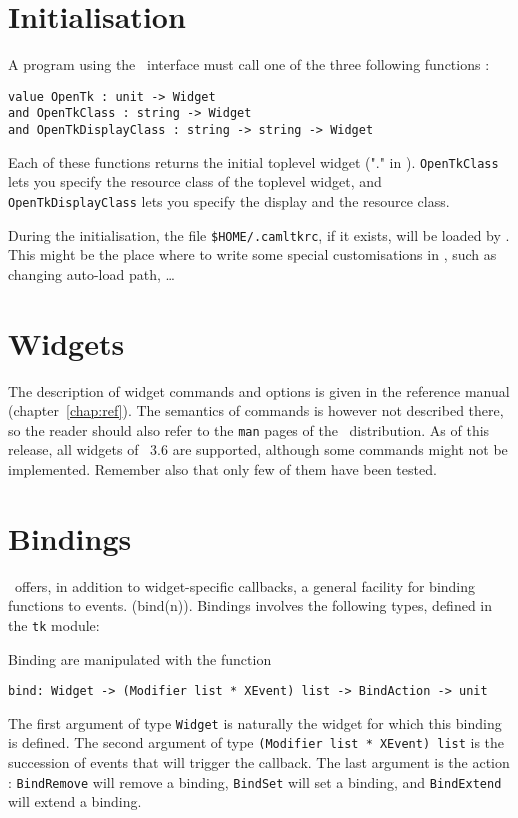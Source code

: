\section{Initialisation}
A program using the \camltk\ interface must call one of the three following
functions :
\begin{verbatim}
value OpenTk : unit -> Widget
and OpenTkClass : string -> Widget
and OpenTkDisplayClass : string -> string -> Widget
\end{verbatim}
Each of these functions returns the initial toplevel widget ("." in \tcl\tk).
\verb|OpenTkClass| lets you specify the resource class of the toplevel
widget, and \verb|OpenTkDisplayClass| lets you specify the display and the
resource class.

During the initialisation, the file \verb|$HOME/.camltkrc|, if it exists,
will be loaded by \tcl\tk. This might be the place where to write some
special customisations in \tcl, such as changing auto-load path, \ldots 

\section{Widgets}
The description of widget commands and options is given in the reference
manual (chapter~\ref{chap:ref}). The semantics of commands is however not
described there, so the reader should also refer to the \verb|man| pages of
the \tk\ distribution. 
As of this release, all widgets of \tk\ 3.6 are supported, although some
commands might not be implemented. Remember also that only few of them have
been tested.

\section{Bindings}
\tk\ offers, in addition to widget-specific callbacks, a general facility
for binding functions to events. (bind(n)).
Bindings involves the following types, defined in the \verb|tk| module:


Binding are manipulated with the function
\begin{verbatim}
bind: Widget -> (Modifier list * XEvent) list -> BindAction -> unit
\end{verbatim} 

The first argument of type \verb|Widget| is naturally the widget for which
this binding is defined.
The second argument of type \verb|(Modifier list * XEvent) list| is the 
succession of events that will trigger the callback.
The last argument is the action : \verb|BindRemove| will remove a binding,
\verb|BindSet| will set a binding, and \verb|BindExtend| will extend a
binding.

